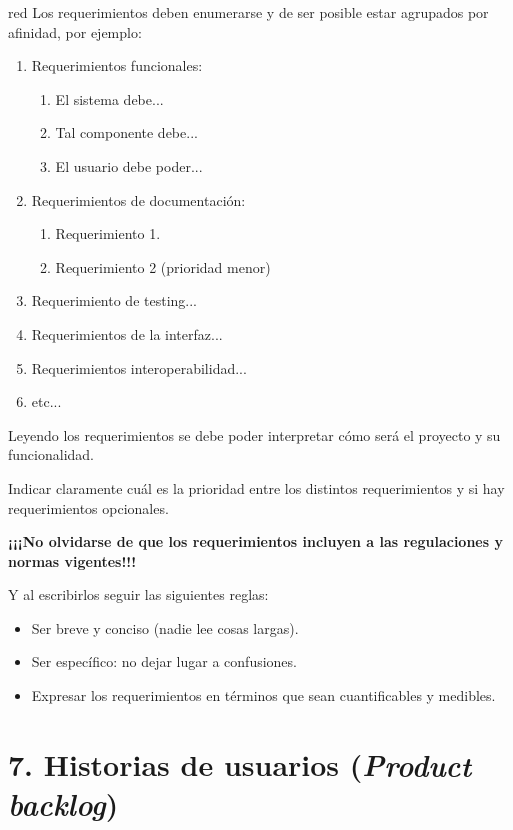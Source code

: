 \documentclass[
11pt, %
codirector, %
]{charter}
\begin{document}
\begin{consigna}{red}
	Los requerimientos deben enumerarse y de ser posible estar agrupados por afinidad, por ejemplo:

	\begin{enumerate}
		\item Requerimientos funcionales:
		      \begin{enumerate}
			      \item El sistema debe...
			      \item Tal componente debe...
			      \item El usuario debe poder...
		      \end{enumerate}
		\item Requerimientos de documentación:
		      \begin{enumerate}
			      \item Requerimiento 1.
			      \item Requerimiento 2 (prioridad menor)
		      \end{enumerate}
		\item Requerimiento de testing...
		\item Requerimientos de la interfaz...
		\item Requerimientos interoperabilidad...
		\item etc...
	\end{enumerate}

	Leyendo los requerimientos se debe poder interpretar cómo será el proyecto y su funcionalidad.

	Indicar claramente cuál es la prioridad entre los distintos requerimientos y si hay requerimientos opcionales.

	\textbf{¡¡¡No olvidarse de que los requerimientos incluyen a las regulaciones y normas vigentes!!!}

	Y al escribirlos seguir las siguientes reglas:
	\begin{itemize}
		\item Ser breve y conciso (nadie lee cosas largas).
		\item Ser específico: no dejar lugar a confusiones.
		\item Expresar los requerimientos en términos que sean cuantificables y medibles.
	\end{itemize}

\end{consigna}

\section{7. Historias de usuarios (\textit{Product backlog})}
\label{sec:backlog}
\end{document}
